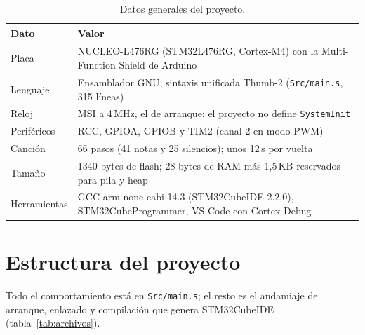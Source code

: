 \documentclass[11pt,letterpaper]{article}
\begin{document}
\begin{table}[H]
  \centering\small
  \caption{Datos generales del proyecto.}
  \label{tab:datos}
  \begin{tabularx}{\textwidth}{@{}P{3.1cm} L@{}}
    \toprule
    Dato & Valor \\
    \midrule
    Placa         & NUCLEO-L476RG (STM32L476RG, Cortex-M4) con la Multi-Function Shield de Arduino \\
    Lenguaje      & Ensamblador GNU, sintaxis unificada Thumb-2 (\texttt{Src/main.s}, 315 líneas) \\
    Reloj         & MSI a 4\,MHz, el de arranque: el proyecto no define \texttt{SystemInit} \\
    Periféricos   & RCC, GPIOA, GPIOB y TIM2 (canal 2 en modo PWM) \\
    Canción       & 66 pasos (41 notas y 25 silencios); unos 12\,s por vuelta \\
    Tamaño        & 1340 bytes de flash; 28 bytes de RAM más 1,5\,KB reservados para pila y heap \\
    Herramientas  & GCC arm-none-eabi 14.3 (STM32CubeIDE 2.2.0), STM32CubeProgrammer, VS Code con Cortex-Debug \\
    \bottomrule
  \end{tabularx}
\end{table}

\section{Estructura del proyecto}

Todo el comportamiento está en \texttt{Src/main.s}; el resto es el andamiaje de arranque, enlazado y
compilación que genera STM32CubeIDE (tabla~\ref{tab:archivos}).
\end{document}
